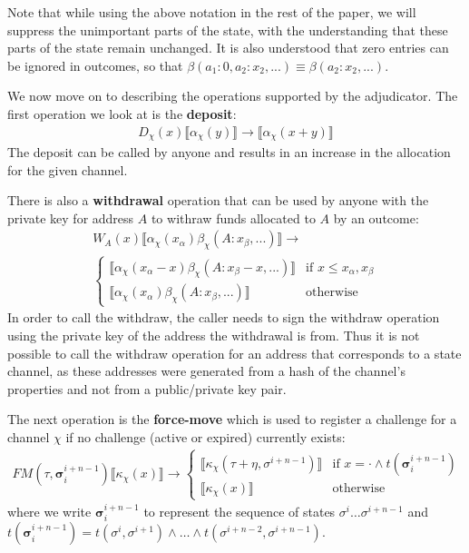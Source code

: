 \documentclass{article}
\theoremstyle{definition}
\newcommand{\adj}[1]{\llbracket #1 \rrbracket}
\begin{document}
Note that while using the above notation in the rest of the paper, we will suppress the unimportant parts of the state, with the understanding that these parts of the state remain unchanged. It is also understood that zero entries can be ignored in outcomes, so that $\beta(a_1: 0, a_2:x_2,...) \equiv \beta(a_2:x_2, ...)$.

We now move on to describing the operations supported by the adjudicator. The first operation we look at is the \textbf{deposit}:
\begin{align*}
D_\chi(x) \adj{\alpha_\chi(y)} \rightarrow \adj{\alpha_\chi(x + y)}
\end{align*}
The deposit can be called by anyone and results in an increase in the allocation for the given channel.

There is also a \textbf{withdrawal} operation that can be used by anyone with the private key for address $A$ to withraw funds allocated to $A$ by an outcome:
\begin{multline*}
W_A(x) \adj{\alpha_\chi(x_\alpha)\beta_\chi(A: x_\beta, ...)} \rightarrow \\
\begin{cases}
  \adj{\alpha_\chi(x_\alpha - x)\beta_\chi(A: x_\beta - x, ...)} &
  \text{if } x \leq x_\alpha, x_\beta  \\
  \adj{\alpha_\chi(x_\alpha)\beta_\chi(A: x_\beta, ...)} &
  \text{otherwise}
\end{cases}
\end{multline*}
In order to call the withdraw, the caller needs to sign the withdraw operation using the private key of the address the withdrawal is from. Thus it is not possible to call the withdraw operation for an address that corresponds to a state channel, as these addresses were generated from a hash of the channel's properties and not from a public/private key pair.

The next operation is the \textbf{force-move} which is used to register a challenge for a channel $\chi$ if no challenge (active or expired) currently exists:
\begin{align*}
FM(\tau, \bm{\sigma}_i^{i+n-1}) \adj{\kappa_\chi(x)} \rightarrow 
\begin{cases}
  \adj{\kappa_\chi(\tau + \eta, \sigma^{i+n-1})} &
  \text{if } x = \cdot \wedge t(\bm{\sigma}_i^{i+n-1}) \\
  \adj{\kappa_\chi(x)} &
  \text{otherwise}
\end{cases}
\end{align*}
where we write $\bm{\sigma}_i^{i+n-1}$ to represent the sequence of states $\sigma^i \dots \sigma^{i+n-1}$ and $t(\bm{\sigma}_i^{i+n-1}) = t(\sigma^{i}, \sigma^{i+1}) \wedge \dots \wedge t(\sigma^{i+n-2}, \sigma^{i+n-1})$.
\end{document}
